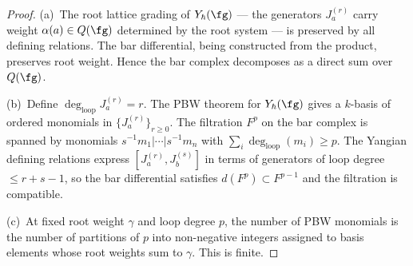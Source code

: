 \begin{proof}
(a)~The root lattice grading of $Y_\hbar(\fg)$ ---
the generators $J^{(r)}_a$ carry weight
$\alpha(a) \in Q(\fg)$ determined by the root
system --- is preserved by all defining relations.  The bar
differential, being constructed from the product, preserves root
weight.  Hence the bar complex decomposes as a direct sum over
$Q(\fg)$.

(b)~Define $\deg_{\mathrm{loop}} J^{(r)}_a = r$.  The PBW
theorem for $Y_\hbar(\fg)$ \cite{Drinfeld85,molev-yangians} gives
a $k$-basis of ordered monomials in $\{J^{(r)}_a\}_{r \ge 0}$.
The filtration $F^p$ on the bar complex is spanned by monomials
$s^{-1}m_1 | \cdots | s^{-1}m_n$ with
$\sum_i \deg_{\mathrm{loop}}(m_i) \ge p$.  The Yangian defining
relations express $[J^{(r)}_a, J^{(s)}_b]$ in terms of generators
of loop degree $\le r + s - 1$, so the bar differential satisfies
$d(F^p) \subset F^{p-1}$ and the filtration is compatible.

(c)~At fixed root weight $\gamma$ and loop degree $p$, the number
of PBW monomials is the number of partitions of $p$ into
non-negative integers assigned to basis elements whose root weights
sum to $\gamma$.  This is finite.
\end{proof}

